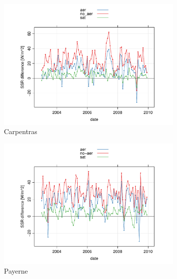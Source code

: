 \begin{figure}[h!]
  \centering\begin{subfigure}{0.5\textwidth}
    \includegraphics[width=1\textwidth]{figs/capitulo6/CarpentrasMesesDif.pdf}
    \caption{Carpentras}
    \label{Carpentras}
  \end{subfigure}
  \centering\begin{subfigure}{0.5\textwidth}
    \includegraphics[width=1\textwidth]{figs/capitulo6/PayerneMesesDif.pdf}
    \caption{Payerne}
    \label{Payerne}
  \end{subfigure}
    \centering\begin{subfigure}{0.5\textwidth}

\end{subfigure}
\end{figure}
